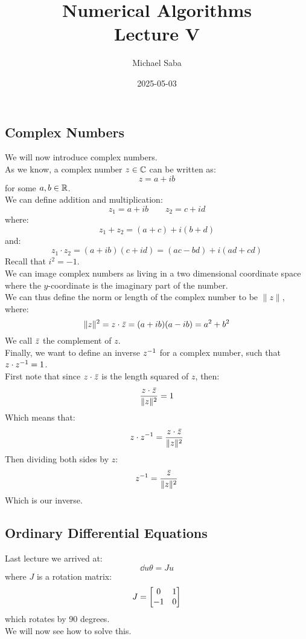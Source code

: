 \documentclass[12pt]{article}
\title{%
    \Huge Numerical Algorithms \\
    \Large Lecture V
}
\date{2025-05-03}
\author{Michael Saba}
\begin{document}
\maketitle
\newpage
\setlength{\parindent}{0pt}

\subsection*{Complex Numbers}

We will now introduce complex numbers. \\
As we know, a complex number $z \in \mathbb{C}$
can be written as:
\[ z = a + ib \]
for some $a, b \in \mathbb{R}$. \\
We can define addition and multiplication:
\[ z_1 = a + ib \qquad z_2 = c + id \]
where:
\[ z_1 + z_2 = (a + c) + i(b + d) \]
and:
\[ z_1 \cdot z_2 = 
(a + ib)(c + id) = 
(ac - bd) + i(ad + cd) \]
Recall that $i^2 = -1$. \\

We can image complex numbers as living
in a two dimensional coordinate space
where the $y$-coordinate is the imaginary
part of the number. \\
We can thus define the norm or length
of the complex number to 
be $\|z\|$, where:
\[ \|z\|^2 = z \cdot \,\overline{\!{z}}
= (a + ib)(a - ib) = a^2 + b^2 \]
We call $\,\overline{\!{z}}$ the complement of $z$. \\

Finally, we want to define an inverse
$z^{-1}$ for a complex number, such that
$z \cdot z^{-1} = 1$. \\
First note that since $z \cdot \,\overline{\!{z}}$
is the length squared of $z$, then:
\[ \dfrac{z \cdot \,\overline{\!{z}}}{\|z\|^2} = 1 \]
Which means that:
\[ z \cdot z^{-1} = 
\dfrac{z \cdot \,\overline{\!{z}}}{\|z\|^2} \]
Then dividing both sides by $z$:
\[ z^{-1} = 
\dfrac{\,\overline{\!{z}}}{\|z\|^2} \]
Which is our inverse. \\

\newpage

\subsection*{Ordinary Differential Equations}

Last lecture we arrived at:
\[ \dd{u}{\theta} = Ju \]
where $J$ is a rotation matrix:
\[ J = \begin{bmatrix} {0}&{1}\\{-1}&{0} \end{bmatrix} \]
which rotates by $90$ degrees. \\
We will now see how to solve this. \\
\end{document}
